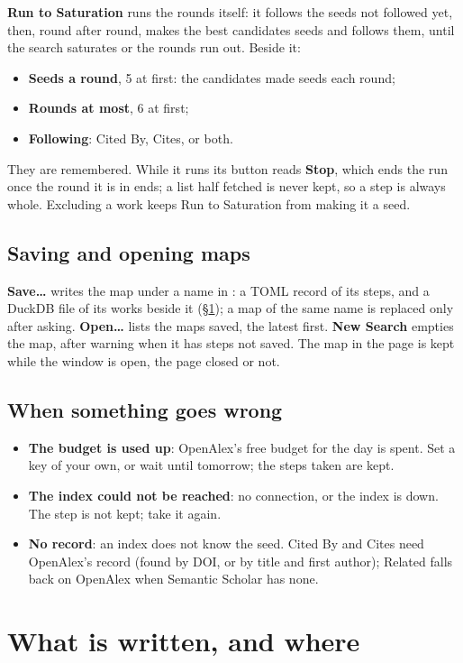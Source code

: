 \textbf{Run to Saturation} runs the rounds itself: it follows the seeds not followed yet, then, round after round, makes the
best candidates seeds and follows them, until the search saturates or the rounds run out. Beside it:
\begin{itemize}
  \item \textbf{Seeds a round}, 5 at first: the candidates made seeds each round;
  \item \textbf{Rounds at most}, 6 at first;
  \item \textbf{Following}: Cited By, Cites, or both.
\end{itemize}
They are remembered. While it runs its button reads \textbf{Stop}, which ends the run once the round it is in ends; a list
half fetched is never kept, so a step is always whole. Excluding a work keeps Run to Saturation from making it a seed.

\subsection{Saving and opening maps}
\textbf{Save\dots} writes the map under a name in : a TOML record of its steps, and a DuckDB
file of its works beside it (\S\ref{sec:files}); a map of the same name is replaced only after asking. \textbf{Open\dots}
lists the maps saved, the latest first. \textbf{New Search} empties the map, after warning when it has steps not saved.
The map in the page is kept while the window is open, the page closed or not.

\subsection{When something goes wrong}
\begin{itemize}
  \item \textbf{The budget is used up}: OpenAlex's free budget for the day is spent. Set a key of your own, or wait until
    tomorrow; the steps taken are kept.
  \item \textbf{The index could not be reached}: no connection, or the index is down. The step is not kept; take it again.
  \item \textbf{No record}: an index does not know the seed. Cited By and Cites need OpenAlex's record (found by DOI, or by
    title and first author); Related falls back on OpenAlex when Semantic Scholar has none.
\end{itemize}

\section{What is written, and where}\label{sec:files}

